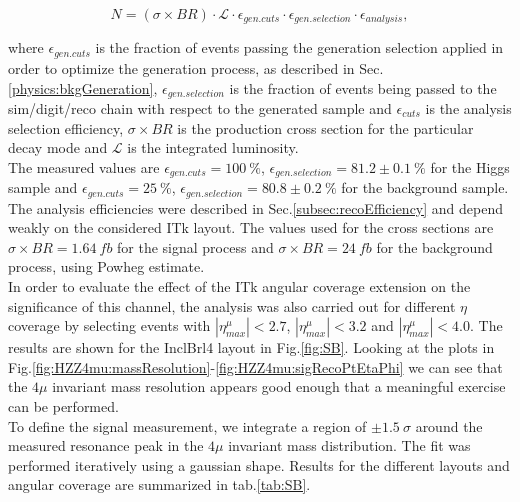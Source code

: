 \documentclass[a4paper,twoside,12pt]{book}
\begin{document}
\begin{equation*}
N = (\sigma \times BR)\cdot \mathcal{L}\cdot \epsilon_{gen. cuts}\cdot \epsilon_{gen. selection} \cdot \epsilon_{analysis},
\end{equation*}

where $\epsilon_{gen. cuts}$ is the fraction of events passing the generation selection applied in order to optimize the generation process, as described in Sec.\ref{physics:bkgGeneration}, 
$\epsilon_{gen. selection}$ is the fraction of events being passed to the sim/digit/reco chain with respect to the generated sample and $\epsilon_{cuts}$ is the 
analysis selection efficiency, $\sigma \times BR$ is the production cross section for the particular decay mode and $\mathcal{L}$ is the integrated luminosity. \\

The measured values are $\epsilon_{gen. cuts} = 100\ \%$, $\epsilon_{gen. selection} = 81.2 \pm 0.1\ \%$ for the Higgs sample and 
$\epsilon_{gen. cuts} = 25\ \%$, $\epsilon_{gen. selection} = 80.8 \pm 0.2\ \%$ for
the background sample. The analysis efficiencies were described in Sec.\ref{subsec:recoEfficiency} and depend weakly on the considered ITk layout. The values used for the cross sections are
$\sigma \times BR = 1.64\ fb$ for the signal process and $\sigma \times BR = 24\ fb$ for the background process, using Powheg\cite{Powheg} estimate.\\

In order to evaluate the effect of the ITk angular coverage extension on the significance of this channel, the analysis was also carried out for different $\eta$ coverage by selecting 
events with $|\eta^\mu_{max}| < 2.7$, $|\eta^\mu_{max}| < 3.2$ and $|\eta^\mu_{max}| < 4.0$. The results are shown for the InclBrl4 layout in Fig.\ref{fig:SB}. Looking at the plots in
Fig.\ref{fig:HZZ4mu:massResolution}-\ref{fig:HZZ4mu:sigRecoPtEtaPhi} we can see that the $4\mu$ invariant mass resolution appears good enough that a meaningful exercise can be performed. \\

To define the signal measurement, we integrate a region of $\pm 1.5\ \sigma$ around the measured resonance peak in the $4\mu$ invariant mass distribution. The fit was performed iteratively 
using a gaussian shape. Results for the different layouts and angular coverage are summarized in tab.\ref{tab:SB}.
\end{document}
